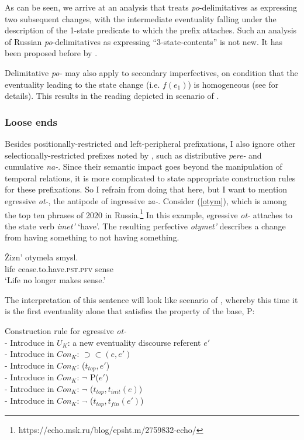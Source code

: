 \documentclass[output=paper,colorlinks,citecolor=brown]{langscibook}
\begin{document}
As can be seen, we arrive at an analysis that treats \textit{po}-delimitatives as expressing two subsequent changes, with the intermediate eventuality falling under the description of the 1-state predicate to which the prefix attaches. Such an analysis of Russian \textit{po}-delimitatives as expressing ``3-state-contents'' is not new. It has been proposed before by \citet[313--314]{Shatun09}. 

Delimitative \textit{po-} may also apply to secondary imperfectives, on condition that the eventuality leading to the state change (i.e. $f(e_1)$) is homogeneous (see \citealt{Mehlig06} for details). This results in the reading depicted in scenario  of .  

\subsubsection{Loose ends}\label{others}

Besides positionally-restricted and left-peripheral prefixations, I also ignore other selectionally-restricted prefixes noted by \citet[49]{Tatevo13}, such as distributive \textit{pere-} and cumulative \textit{na-}. Since their semantic impact goes beyond the manipulation of temporal relations, it is more complicated to state appropriate construction rules for these prefixations. So I refrain from doing that here, but I want to mention egressive \textit{ot-}, the antipode of ingressive \textit{za-}. Consider (\ref{otym}), which is among the top ten phrases of 2020 in Russia.\footnote{https://echo.msk.ru/blog/epsht.m/2759832-echo/} In this example, egressive \textit{ot-} attaches to the state verb \textit{imet'} `have'. The resulting perfective \textit{otymet'} describes a change from having something to not having something.   

\ea\label{otym}
\gll \v{Z}izn' otymela smysl. \\
life cease.to.have.\textsc{pst.pfv} sense \\
\glt `Life no longer makes sense.' 
\z 
  
\noindent The interpretation of this sentence will look like scenario  of ,
whereby this time it is the first eventuality alone that satisfies the property of the base, P:

\ea\label{CRot} Construction rule for egressive \textit{ot-} \\
- Introduce in $U_K$: a new eventuality discourse referent $e'$\\
- Introduce in $Con_K$: $\supset\subset (e,e')$\\
- Introduce in $Con_K$: ($t_{top},e'$)\\
- Introduce in $Con_K$: $\neg$ P($e'$)\\
- Introduce in $Con_K$: 
$\neg$ ($t_{top},t_{init}(e)$)\\
- Introduce in $Con_K$: $\neg$ ($t_{top},t_{fin}(e')$)\\
\z
\end{document}
